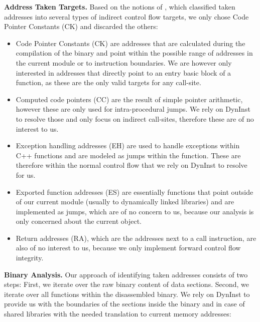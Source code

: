 \textbf{Address Taken Targets.}
Based on the notions of \cite{mingwei:sekar}, which classified taken addresses into several types of indirect control flow targets,
we only chose { Code Pointer Constants (CK)} and discarded the others:
\begin{itemize}

\item { Code Pointer Constants (CK)} are addresses that are calculated during the compilation of the binary and point within
the possible range of addresses in the current module or to instruction boundaries. We are however only interested in addresses
that directly point to an entry basic block of a function, as these are the only valid targets for any call-site.

\item { Computed code pointers (CC)} are the result of simple pointer arithmetic, however these are only used for intra-procedural jumps. 
We rely on DynInst to resolve those and only focus on indirect call-sites, therefore these are of no interest to us.

\item{ Exception handling addresses (EH)} are used to handle exceptions within C++ functions and are modeled as jumps within the function. 
These are therefore within the normal control flow that we rely on DynInst to resolve for us.

\item{ Exported function addresses (ES)} are essentially functions that point outside of our current module (usually to dynamically 
linked libraries) and are implemented as jumps, which are of no concern to us, because our analysis is only concerned about the current object.

\item { Return addresses (RA)}, which are the addresses next to a call instruction, are also of no interest to us, because we only 
implement forward { control flow integrity}.
\end{itemize}

\textbf{Binary Analysis.}
Our approach of identifying taken addresses consists of two steps: First, we iterate over the raw binary content of data sections. Second,
we iterate over all functions within the disassembled binary. We rely on DynInst to provide us with the boundaries of the sections inside
the binary and in case of shared libraries with the needed translation to current memory addresses:

